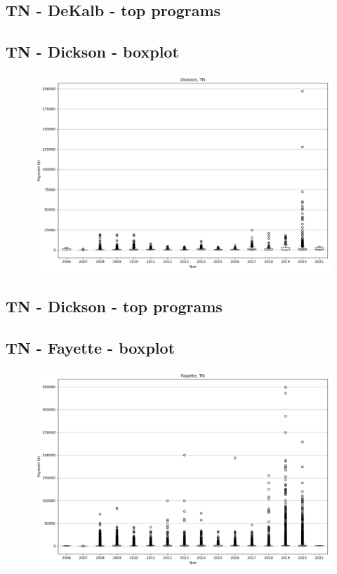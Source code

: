 \subsection*{TN - DeKalb - top programs}

\newpage
\subsection*{TN - Dickson - boxplot}
\begin{figure}[h]
\centering
\includegraphics[width=7in]{../output/boxplots/counties/Dickson-TN_boxplot.png}
\end{figure}


\subsection*{TN - Dickson - top programs}

\newpage
\subsection*{TN - Fayette - boxplot}
\begin{figure}[h]
\centering
\includegraphics[width=7in]{../output/boxplots/counties/Fayette-TN_boxplot.png}
\end{figure}


